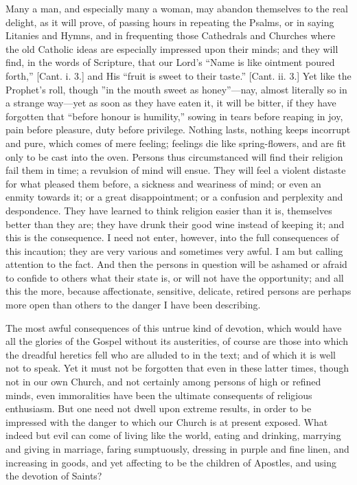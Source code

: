 Many a man, and especially many a woman, may abandon themselves to
the real delight, as it will prove, of passing hours in repeating the
Psalms, or in saying Litanies and Hymns, and in frequenting those
Cathedrals and Churches where the old Catholic ideas are especially
impressed upon their minds; and they will find, in the words of
Scripture, that our Lord's ``Name is like ointment poured
forth,'' [Cant. i. 3.] and His ``fruit is sweet to their
taste.'' [Cant. ii. 3.] Yet like the Prophet's roll, though ''in
the mouth sweet as honey''—nay, almost literally so in a strange way—yet
as soon as they have eaten it, it will be bitter, if they have
forgotten that ``before honour is humility,'' sowing in tears
before reaping in joy, pain before pleasure, duty before privilege.
Nothing lasts, nothing keeps incorrupt and pure, which comes of mere
feeling; feelings die like spring-flowers, and are fit only to be cast
into the oven. Persons thus circumstanced will find their religion
fail them in time; a revulsion of mind will ensue. They will feel a
violent distaste for what pleased them before, a sickness and
weariness of mind; or even an enmity towards it; or a great
disappointment; or a confusion and perplexity and despondence. They
have learned to think religion easier than it is, themselves better
than they are; they have drunk their good wine instead of keeping it;
and this is the consequence. I need not enter, however, into the full
consequences of this incaution; they are very various and sometimes
very awful. I am but calling attention to the fact. And then the
persons in question will be ashamed or afraid to confide to others
what their state is, or will not have the opportunity; and all this
the more, because affectionate, sensitive, delicate, retired persons
are perhaps more open than others to the danger I have been
describing.

The most awful consequences of this untrue kind of devotion, which
would have all the glories of the Gospel without its austerities, of
course are those into which the dreadful heretics fell who are alluded
to in the text; and of which it is well not to speak. Yet it must not
be forgotten that even in these latter times, though not in our own
Church, and not certainly among persons of high or refined minds, even
immoralities have been the ultimate consequents of religious
enthusiasm. But one need not dwell upon extreme results, in order to
be impressed with the danger to which our Church is at present
exposed. What indeed but evil can come of living like the world,
eating and drinking, marrying and giving in marriage, faring
sumptuously, dressing in purple and fine linen, and increasing in
goods, and yet affecting to be the children of Apostles, and using the
devotion of Saints?

